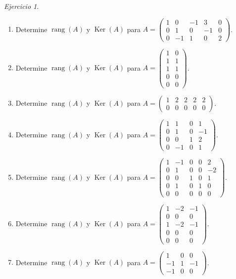 \documentclass[12pt]{article}
\theoremstyle{remark}
\newtheorem{Ejer}[definicion]{Ejercicio}
\newcommand{\rang}{\operatorname{rang}}
\newcommand{\Ker}{\operatorname{Ker}}
\begin{document}
\begin{Ejer}
\begin{enumerate}[resume=banco]
\item Determine $\rang(A)$ y $\Ker(A)$ para $A=\begin{pmatrix}1&0&-1&3&0\\0&1&0&-1&0\\0&-1&1&0&2\end{pmatrix}$.

\item Determine $\rang(A)$ y $\Ker(A)$ para $A=\begin{pmatrix}1&0\\1&1\\1&1\\0&0\\0&0\end{pmatrix}$.

\item Determine $\rang(A)$ y $\Ker(A)$ para $A=\begin{pmatrix}1&2&2&2&2\\0&0&0&0&0\end{pmatrix}$.

\item Determine $\rang(A)$ y $\Ker(A)$ para $A=\begin{pmatrix}1&1&0&1\\0&1&0&-1\\0&0&1&2\\0&-1&0&1\end{pmatrix}$.

\item Determine $\rang(A)$ y $\Ker(A)$ para $A=\begin{pmatrix}1&-1&0&0&2\\0&1&0&0&-2\\0&0&1&0&1\\0&1&0&1&0\\0&0&0&0&0\end{pmatrix}$.

\item Determine $\rang(A)$ y $\Ker(A)$ para $A=\begin{pmatrix}1&-2&-1\\0&0&0\\1&-2&-1\\0&0&0\\0&0&0\end{pmatrix}$.

\item Determine $\rang(A)$ y $\Ker(A)$ para $A=\begin{pmatrix}1&0&0\\-1&1&-1\\-1&0&0\end{pmatrix}$.


\end{enumerate}
\end{Ejer}
\end{document}
